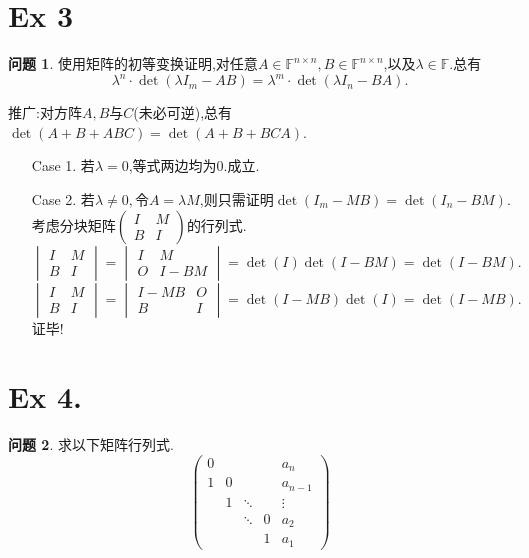 \documentclass[11pt]{ctexart}
\theoremstyle{definition}
\newtheorem{qqq}{问题}[section]
\numberwithin{equation}{section}
\newcommand{\op}[1]{\operatorname{#1}}%
\begin{document}
\[{}\]
\[{}\]
\[{}\]
\section{Ex 3}
\begin{qqq}
    使用矩阵的初等变换证明,对任意$A\in \mathbb{F}^{n\times n},B\in \mathbb{F}^{n\times n}$,以及$\lambda \in \mathbb{F}$.总有
    \begin{equation}
        \lambda^n \cdot \op{det}(\lambda I_m-AB)=\lambda^m \cdot \det (\lambda I_n-BA).
    \end{equation}
    \begin{qing}
        推广:对方阵$A,B$与$C$(未必可逆),总有$\det(A+B+ABC)=\det(A+B+BCA)$.
    \end{qing}
\end{qqq}
\begin{aaa}
    \begin{itemize}
        \item [Case 1.]若$\lambda=0$,等式两边均为0.成立.
        \item [Case 2.]若$\lambda \neq 0,$令$A=\lambda M$,则只需证明$\det(I_m-MB)=\det(I_n-BM)$.\\考虑分块矩阵$\begin{pmatrix}
            I&M\\B&I
        \end{pmatrix}$的行列式.
        \[\begin{vmatrix}
            I&M\\B&I
        \end{vmatrix}=\begin{vmatrix}
            I&M\\O&I-BM
        \end{vmatrix}=\det(I)\det(I-BM)=\det(I-BM).\]
        \[\begin{vmatrix}
            I&M\\B&I
        \end{vmatrix}=\begin{vmatrix}
            I-MB&O\\B&I
        \end{vmatrix}=\det(I-MB)\det(I)=\det(I-MB).\]
        证毕!
    \end{itemize}
\end{aaa}


\newpage


\section{Ex 4.}
\begin{qqq}
    求以下矩阵行列式.
    \begin{equation}
        \begin{pmatrix}
            0& & & &a_n\\1&0& & &a_{n-1}\\ & 1&\ddots& &\vdots\\ & &\ddots&0&a_2\\ & & &1&a_1
        \end{pmatrix}
    \end{equation}
\end{qqq}
\end{document}
